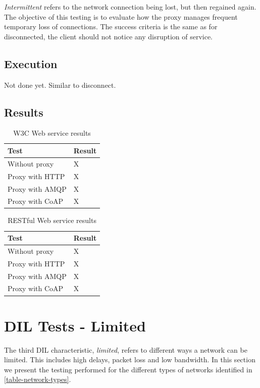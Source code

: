\textit{Intermittent} refers to the network connection being lost, but then
regained again. The objective of this testing is to evaluate how the proxy
manages frequent temporary loss of connections. The success criteria is the same
as for disconnected, the client should not notice any disruption of service.

\subsection{Execution}

Not done yet. Similar to disconnect.

\subsection{Results}

\begin{table}[H]
\begin{tabular}{| l | l |}
\hline
  \textbf{Test} & \textbf{Result} \\ \hline
  Without proxy & X \\ \hline
  Proxy with HTTP & X \\ \hline
  Proxy with AMQP & X \\ \hline
  Proxy with CoAP & X \\ \hline
\end{tabular}
\caption{W3C Web service results}
\end{table}

\begin{table}[H]
\begin{tabular}{| l | l |}
\hline
  \textbf{Test} & \textbf{Result} \\ \hline
  Without proxy & X \\ \hline
  Proxy with HTTP & X \\ \hline
  Proxy with AMQP & X \\ \hline
  Proxy with CoAP & X \\ \hline
\end{tabular}
\caption{RESTful Web service results}
\end{table}

\section{DIL Tests - Limited}

The third DIL characteristic, \textit{limited}, refers to different ways a
network can be limited. This includes high delays, packet loss and low
bandwidth. In this section we present the testing performed for the different types of networks identified in \cref{table-network-types}.



